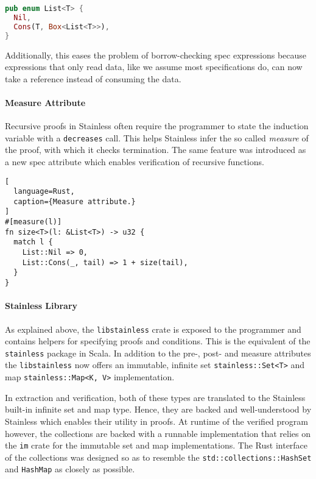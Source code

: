 \begin{lstlisting}[language=Rust]
pub enum List<T> {
  Nil,
  Cons(T, Box<List<T>>),
}
\end{lstlisting}

Additionally, this eases the problem of borrow-checking spec expressions
because expressions that only read data, like we assume most
specifications do, can now take a reference instead of consuming the
data.

\paragraph{Measure Attribute}

Recursive proofs in Stainless often require the programmer to state the
induction variable with a \passthrough{\lstinline!decreases!} call. This
helps Stainless infer the so called \emph{measure} of the proof, with
which it checks termination. The same feature was introduced as a new
spec attribute which enables verification of recursive functions.

\begin{lstlisting}[
  language=Rust,
  caption={Measure attribute.}
]
#[measure(l)]
fn size<T>(l: &List<T>) -> u32 {
  match l {
    List::Nil => 0,
    List::Cons(_, tail) => 1 + size(tail),
  }
}
\end{lstlisting}

\paragraph{Stainless Library}

As explained above, the \passthrough{\lstinline!libstainless!} crate is
exposed to the programmer and contains helpers for specifying proofs and
conditions. This is the equivalent of the
\passthrough{\lstinline!stainless!} package in Scala. In addition to the
pre-, post- and measure attributes the
\passthrough{\lstinline!libstainless!} now offers an immutable, infinite
set \passthrough{\lstinline!stainless::Set<T>!} and map
\passthrough{\lstinline!stainless::Map<K, V>!} implementation.

In extraction and verification, both of these types are translated to
the Stainless built-in infinite set and map type. Hence, they are backed
and well-understood by Stainless which enables their utility in proofs.
At runtime of the verified program however, the collections are backed
with a runnable implementation that relies on the
\passthrough{\lstinline!im!} crate for the immutable set and map
implementations. The Rust interface of the collections was designed so
as to resemble the \passthrough{\lstinline!std::collections::HashSet!}
and \passthrough{\lstinline!HashMap!} as closely as possible.

